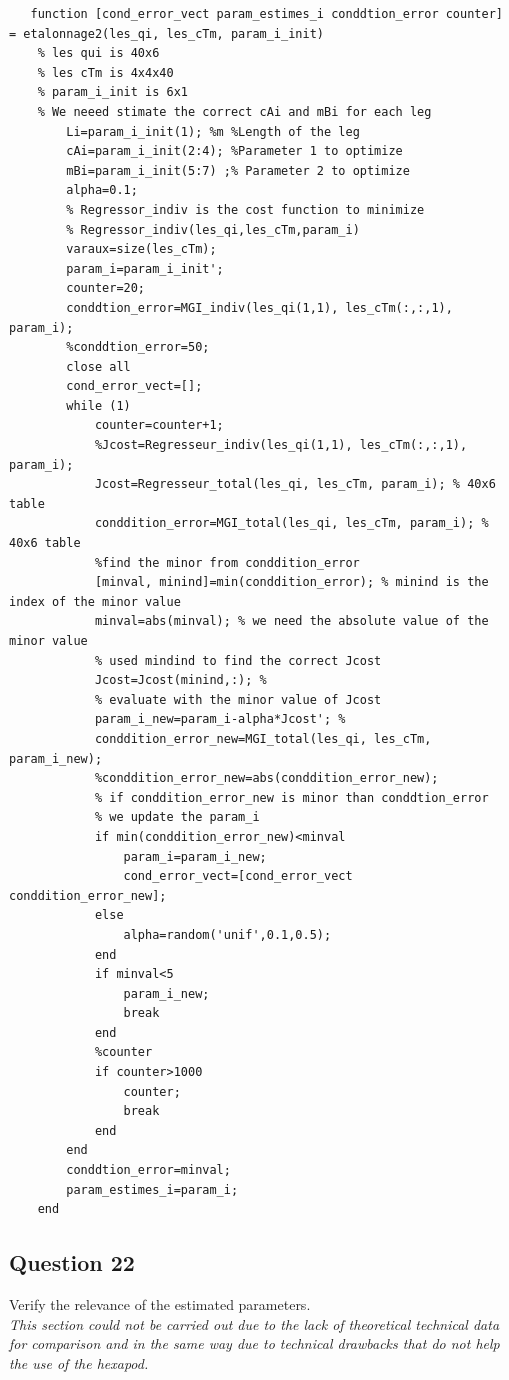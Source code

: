 \documentclass[12pt, twoside]{report}
\begin{document}
\begin{lstlisting}
   function [cond_error_vect param_estimes_i conddtion_error counter] = etalonnage2(les_qi, les_cTm, param_i_init)
    % les qui is 40x6 
    % les cTm is 4x4x40
    % param_i_init is 6x1
    % We neeed stimate the correct cAi and mBi for each leg
        Li=param_i_init(1); %m %Length of the leg 
        cAi=param_i_init(2:4); %Parameter 1 to optimize 
        mBi=param_i_init(5:7) ;% Parameter 2 to optimize
        alpha=0.1;
        % Regressor_indiv is the cost function to minimize
        % Regressor_indiv(les_qi,les_cTm,param_i)    
        varaux=size(les_cTm);    
        param_i=param_i_init';
        counter=20;
        conddtion_error=MGI_indiv(les_qi(1,1), les_cTm(:,:,1), param_i);
        %conddtion_error=50;
        close all
        cond_error_vect=[];
        while (1)
            counter=counter+1;
            %Jcost=Regresseur_indiv(les_qi(1,1), les_cTm(:,:,1), param_i);
            Jcost=Regresseur_total(les_qi, les_cTm, param_i); % 40x6 table
            conddition_error=MGI_total(les_qi, les_cTm, param_i); % 40x6 table
            %find the minor from conddition_error
            [minval, minind]=min(conddition_error); % minind is the index of the minor value
            minval=abs(minval); % we need the absolute value of the minor value
            % used mindind to find the correct Jcost
            Jcost=Jcost(minind,:); %
            % evaluate with the minor value of Jcost
            param_i_new=param_i-alpha*Jcost'; %
            conddition_error_new=MGI_total(les_qi, les_cTm, param_i_new);
            %conddition_error_new=abs(conddition_error_new);
            % if conddition_error_new is minor than conddtion_error
            % we update the param_i
            if min(conddition_error_new)<minval
                param_i=param_i_new;
                cond_error_vect=[cond_error_vect conddition_error_new];
            else
                alpha=random('unif',0.1,0.5);
            end
            if minval<5
                param_i_new;
                break
            end
            %counter
            if counter>1000
                counter;
                break
            end
        end
        conddtion_error=minval;
        param_estimes_i=param_i;
    end 
\end{lstlisting}


\subsection{Question 22}
Verify the relevance of the estimated parameters.\\
\textit{This section could not be carried out due to the lack of theoretical technical data for comparison and in the same way due to technical drawbacks that do not help the use of the hexapod.}
\end{document}
